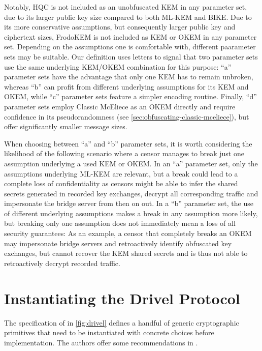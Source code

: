 Notably, HQC is not included as an unobfuscated KEM in any parameter set, due to its larger public key size compared to both ML-KEM and BIKE. Due to its more conservative assumptions, but consequently larger public key and ciphertext sizes, FrodoKEM is not included as KEM or OKEM in any parameter set.
Depending on the assumptions one is comfortable with, different paarameter sets may be suitable. Our definition uses letters to signal that two parameter sets use the same underlying KEM/OKEM combination for this purpose: ``a'' parameter sets have the advantage that only one KEM has to remain unbroken, whereas ``b'' can profit from different underlying assumptions for its KEM and OKEM, while ``c'' parameter sets feature a simpler encoding routine. Finally, ``d'' parameter sets employ Classic McEliece as an OKEM directly and require confidence in its pseudorandomness (see \cref{sec:obfuscating-classic-mceliece}), but offer significantly smaller message sizes.

When choosing between ``a'' and ``b'' parameter sets, it is worth considering the likelihood of the following scenario where a censor manages to break just one assumption underlying a used KEM or OKEM.
In an ``a'' parameter set, only the assumptions underlying ML-KEM are relevant, but a break could lead to a complete loss of confidentiality as censors might be able to infer the shared secrets generated in recorded key exchanges, decrypt all corresponding traffic and impersonate the bridge server from then on out.
In a ``b'' parameter set, the use of different underlying assumptions makes a break in any assumption more likely, but breaking only one assumption does not immediately mean a loss of all security guarantees: As an example, a censor that completely breaks an OKEM may impersonate bridge servers and retroactively identify obfuscated key exchanges, but cannot recover the KEM shared secrets and is thus not able to retroactively decrypt recorded traffic.

\section{Instantiating the Drivel Protocol} \label{sec:drivel-instance}

The specification of \drivel{} in \cref{fig:drivel} defines a handful of generic cryptographic primitives that need to be instantiated with concrete choices before implementation.
The authors offer some recommendations in \cite[Section~4.2]{EPRINT:GRSV25}.

